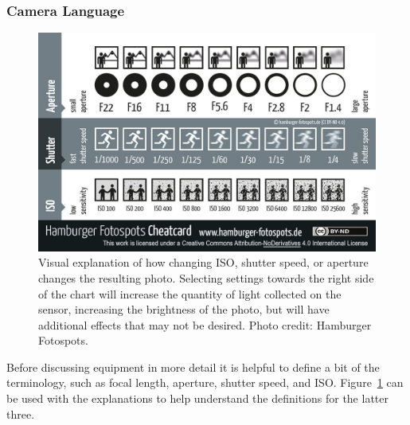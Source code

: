 \documentclass{article}
\newcommand{\contributed}[1]{%
    \par\noindent
    \begingroup
    \setlength{\leftskip}{1em}%
    \itshape
    Contributors: #1
    \par
    \endgroup
    \vspace{0.5em}
}
\begin{document}
\subsubsection{Camera Language}

\begin{figure}[h!]
\begin{centering}
  \includegraphics[width=\linewidth]{Fig12_HamburgerFotospots.jpg}
  \caption{Visual explanation of how changing ISO, shutter speed, or aperture changes the resulting photo. Selecting settings towards the right side of the chart will increase the quantity of light collected on the sensor, increasing the brightness of the photo, but will have additional effects that may not be desired. Photo credit: Hamburger Fotospots.}
  \label{fig-cheatcard}
  \end{centering}
\end{figure}

Before discussing equipment in more detail it is helpful to define a bit of the terminology, such as focal length, aperture, shutter speed, and ISO. Figure~\ref{fig-cheatcard} can be used with the explanations to help understand the definitions for the latter three.
\end{document}
